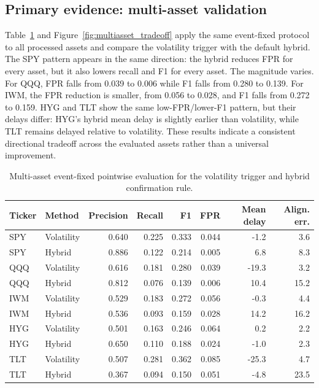 \documentclass[10pt,twocolumn]{article}
\begin{document}
\subsection{Primary evidence: multi-asset validation}
Table~\ref{tab:multiasset_pointwise} and Figure~\ref{fig:multiasset_tradeoff} apply the same event-fixed protocol to all processed assets and compare the volatility trigger with the default hybrid. The SPY pattern appears in the same direction: the hybrid reduces FPR for every asset, but it also lowers recall and F1 for every asset. The magnitude varies. For QQQ, FPR falls from 0.039 to 0.006 while F1 falls from 0.280 to 0.139. For IWM, the FPR reduction is smaller, from 0.056 to 0.028, and F1 falls from 0.272 to 0.159. HYG and TLT show the same low-FPR/lower-F1 pattern, but their delays differ: HYG's hybrid mean delay is slightly earlier than volatility, while TLT remains delayed relative to volatility. These results indicate a consistent directional tradeoff across the evaluated assets rather than a universal improvement.

\begin{table}[t]
\centering
\caption{Multi-asset event-fixed pointwise evaluation for the volatility trigger and hybrid confirmation rule.}
\label{tab:multiasset_pointwise}
\scriptsize
\begin{tabular}{llrrrrrr}
\toprule
Ticker & Method & Precision & Recall & F1 & FPR & Mean delay & Align. err.\\
\midrule
SPY & Volatility & 0.640 & 0.225 & 0.333 & 0.044 & -1.2 & 3.6\\
SPY & Hybrid & 0.886 & 0.122 & 0.214 & 0.005 & 6.8 & 8.3\\
QQQ & Volatility & 0.616 & 0.181 & 0.280 & 0.039 & -19.3 & 3.2\\
QQQ & Hybrid & 0.812 & 0.076 & 0.139 & 0.006 & 10.4 & 15.2\\
IWM & Volatility & 0.529 & 0.183 & 0.272 & 0.056 & -0.3 & 4.4\\
IWM & Hybrid & 0.536 & 0.093 & 0.159 & 0.028 & 14.2 & 16.2\\
HYG & Volatility & 0.501 & 0.163 & 0.246 & 0.064 & 0.2 & 2.2\\
HYG & Hybrid & 0.650 & 0.110 & 0.188 & 0.024 & -1.0 & 2.3\\
TLT & Volatility & 0.507 & 0.281 & 0.362 & 0.085 & -25.3 & 4.7\\
TLT & Hybrid & 0.367 & 0.094 & 0.150 & 0.051 & -4.8 & 23.5\\
\bottomrule
\end{tabular}
\end{table}
\end{document}
